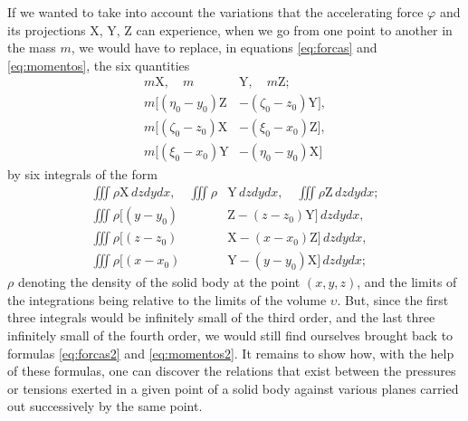 \documentclass[leqno,openright,smallroyalvopaper,8pt,twoside,showtrims]{memoir}
\begin{document}
 If we wanted to take into account the variations that the accelerating force $\varphi$ and its projections X, Y, Z can experience, when we go from one point to another in the mass $m$, we would have to replace, in equations \eqref{eq:forcas} and \eqref{eq:momentos}, the six quantities
\begin{align*}
m\text{X},\quad m&\text{Y},\quad m\text{Z};\\[5pt]
m[(\eta_0-y_0)\text{Z}&-(\zeta_0-z_0)\text{Y}],\\
m[(\zeta_0-z_0)\text{X}&-(\xi_0-x_0)\text{Z}],\\
m[(\xi_0-x_0)\text{Y}&-(\eta_0-y_0)\text{X}]
\end{align*}
by six integrals of the form
\begin{align*}
\textstyle\iiint \rho \text{X}\,dzdydx,\quad \textstyle\iiint \rho &\text{Y}\,dzdydx,\quad \textstyle\iiint \rho \text{Z}\,dzdydx;\\[5pt]
\textstyle\iiint\rho[(y-y_0)&\text{Z}-(z-z_0)\text{Y}]\,dzdydx,\\
\textstyle\iiint\rho[(z-z_0)&\text{X}-(x-x_0)\text{Z}]\,dzdydx,\\
\textstyle\iiint\rho[(x-x_0)&\text{Y}-(y-y_0)\text{X}]\,dzdydx;
\end{align*}
$\rho$ denoting the density of the solid body at the point $(x, y, z)$, and the limits of the integrations being relative to the limits of the volume $\upsilon$. But, since the first three integrals would be infinitely small of the third order, and the last three infinitely small of the fourth order, we would still find ourselves brought back to formulas \eqref{eq:forcas2} and \eqref{eq:momentos2}. It remains to show how, with the help of these formulas, one can discover the relations that exist between the pressures or tensions exerted in a given point of a solid body against various planes carried out successively by the same point.
\end{document}
